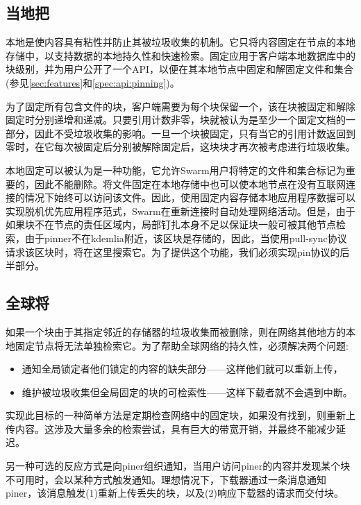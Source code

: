 \subsection{当地把\statusgreen}\label{sec:pinning}

本地是使内容具有粘性并防止其被垃圾收集的机制。它只将内容固定在节点的本地存储中，以支持数据的本地持久性和快速检索。固定应用于客户端本地数据库中的块级别，并为用户公开了一个API，以便在其本地节点中固定和解固定文件和集合(参见\ref{sec:features}和\ref{spec:api:pinning})。

为了固定所有包含文件的块，客户端需要为每个块保留一个，该在块被固定和解除固定时分别递增和递减。只要引用计数非零，块就被认为是至少一个固定文档的一部分，因此不受垃圾收集的影响。一旦一个块被固定，只有当它的引用计数返回到零时，在它每次被固定后分别被解除固定后，这块块才再次被考虑进行垃圾收集。

本地固定可以被认为是一种功能，它允许Swarm用户将特定的文件和集合标记为重要的，因此不能删除。将文件固定在本地存储中也可以使本地节点在没有互联网连接的情况下始终可以访问该文件。因此，使用固定内容存储本地应用程序数据可以实现脱机优先应用程序范式，Swarm在重新连接时自动处理网络活动。但是，由于如果块不在节点的责任区域内，局部钉扎本身不足以保证块一般可被其他节点检索，由于pinner不在kdemlia附近，该区块是存储的，因此，当使用pull-sync协议请求该区块时，将在这里搜索它。为了提供这个功能，我们必须实现pin协议的后半部分。

\subsection{全球将}\label{sec:global-pinning}

如果一个块由于其指定邻近的存储器的垃圾收集而被删除，则在网络其他地方的本地固定节点将无法单独检索它。为了帮助全球网络的持久性，必须解决两个问题:

\begin{itemize}
    \item  通知全局锁定者他们锁定的内容的缺失部分——这样他们就可以重新上传，
    \item  维护被垃圾收集但全局固定的块的可检索性——这样下载者就不会遇到中断。 
\end{itemize}

实现此目标的一种简单方法是定期检查网络中的固定块，如果没有找到，则重新上传内容。这涉及大量多余的检索尝试，具有巨大的带宽开销，并最终不能减少延迟。

另一种可选的反应方式是向piner组织通知，当用户访问piner的内容并发现某个块不可用时，会以某种方式触发通知。理想情况下，下载器通过一条消息通知piner，该消息触发(1)重新上传丢失的块，以及(2)响应下载器的请求而交付块。  

